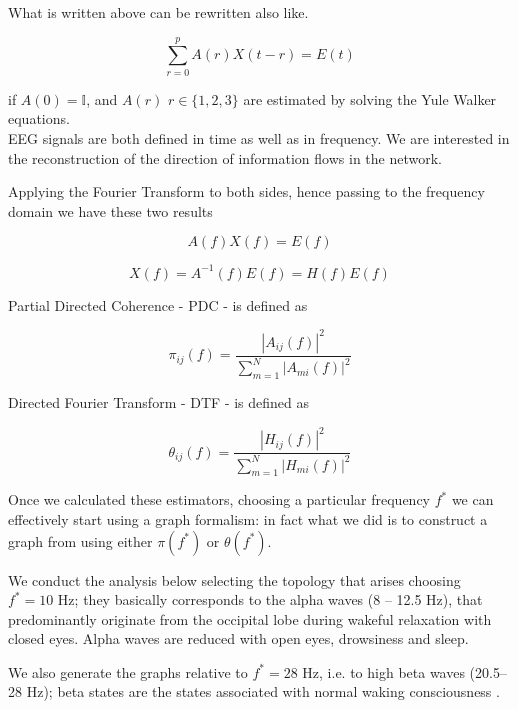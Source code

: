 \documentclass[%
 aip,
 jmp,%
 amsmath,amssymb,
 reprint,%
]{revtex4-1}
\begin{document}
What is written above can be rewritten also like.

\begin{equation}
	\sum_{r = 0}^{p} A(r)X(t-r) = E(t)
\end{equation}

if $A(0) = \mathbb{I}$, and $A(r)$ $r\in \{1,2,3\}$ are estimated by solving the Yule Walker equations. \\

EEG signals are both defined in time as well as in frequency. We are interested in the reconstruction of the direction of information flows in the network.

Applying the Fourier Transform to both sides, hence passing to the frequency domain we have these two results

\begin{equation}
A(f)X(f) = E(f)
\end{equation}

\begin{equation}
X(f) = A^{-1}(f)E(f) = H(f)E(f)
\end{equation}


Partial Directed Coherence - PDC - is defined as 

\begin{equation}
	\pi_{ij}(f) = \frac{|A_{ij}(f)|^2}{\sum_{m=1}^{N}|A_{mi}(f)|^2}
\end{equation}

Directed Fourier Transform - DTF - is defined as 

\begin{equation}
	\theta_{ij}(f) = \frac{|H_{ij}(f)|^2}{\sum_{m=1}^{N}|H_{mi}(f)|^2}
\end{equation}

Once we calculated these estimators, choosing a particular frequency $f^*$ we can effectively start using a graph formalism: in fact what we did is to construct a graph from using either $\pi(f^*)$ or $\theta(f^*)$.

We conduct the analysis below selecting the topology that arises choosing $f^* = \text{10 Hz}$; they basically corresponds to the alpha waves (8 – 12.5 Hz), that predominantly originate from the occipital lobe during wakeful relaxation with closed eyes. Alpha waves are reduced with open eyes, drowsiness and sleep\cite{alphaPalva}.

We also generate the graphs relative to $f^* = \text{28 Hz}$, i.e. to high beta waves (20.5–28 Hz); beta states are the states associated with normal waking consciousness \cite{betaWiki}.
\end{document}
